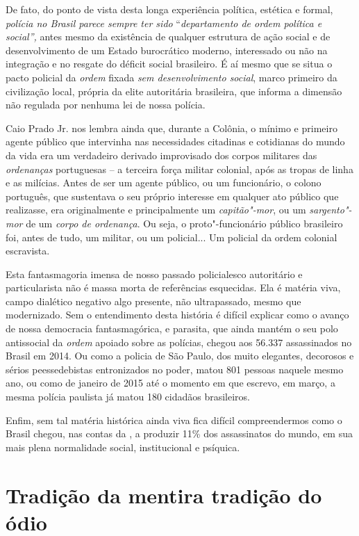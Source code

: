 De fato, do ponto de vista desta longa experiência política, estética e
formal, \emph{polícia no Brasil parece sempre ter sido}
``\emph{departamento de ordem política e social'',} antes mesmo da
existência de qualquer estrutura de ação social e de desenvolvimento de
um Estado burocrático moderno, interessado ou não na integração e no
resgate do déficit social brasileiro. É aí mesmo que se situa o pacto
policial da \emph{ordem} fixada \emph{sem desenvolvimento social}, marco
primeiro da civilização local, própria da elite autoritária brasileira,
que informa a dimensão não regulada por nenhuma lei de nossa polícia.

Caio Prado Jr. nos lembra ainda que, durante a Colônia, o mínimo e
primeiro agente público que intervinha nas necessidades citadinas e
cotidianas do mundo da vida era um verdadeiro derivado improvisado dos
corpos militares das \emph{ordenanças} portuguesas -- a terceira força
militar colonial, após as tropas de linha e as milícias. Antes de ser um
agente público, ou um funcionário, o colono português, que sustentava o
seu próprio interesse em qualquer ato público que realizasse, era
originalmente e principalmente um \emph{capitão"-mor}, ou um
\emph{sargento"-mor} de um \emph{corpo de ordenança}. Ou seja, o
proto"-funcionário público brasileiro foi, antes de tudo, um militar, ou
um policial... Um policial da ordem colonial escravista.

Esta fantasmagoria imensa de nosso passado policialesco autoritário e
particularista não é massa morta de referências esquecidas. Ela é
matéria viva, campo dialético negativo algo presente, não ultrapassado,
mesmo que modernizado. Sem o entendimento desta história é difícil
explicar como o avanço de nossa democracia fantasmagórica, e parasita,
que ainda mantém o seu polo antissocial da \emph{ordem} apoiado sobre as
polícias, chegou aos 56.337 assassinados no Brasil em 2014. Ou como a
policia de São Paulo, dos muito elegantes, decorosos e sérios
peessedebistas entronizados no poder, matou 801 pessoas naquele mesmo
ano, ou como de janeiro de 2015 até o momento em que escrevo, em março,
a mesma polícia paulista já matou 180 cidadãos brasileiros.

Enfim, sem tal matéria histórica ainda viva fica difícil compreendermos
como o Brasil chegou, nas contas da , a produzir 11\% dos
assassinatos do mundo, em sua mais plena normalidade social,
institucional e psíquica.

\chapter{Tradição da mentira tradição do ódio}

